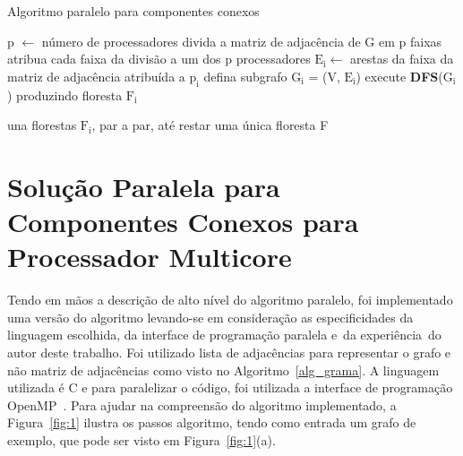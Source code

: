 \documentclass[12pt]{article}
\begin{document}
\begin{algorithm}[H]
    \DontPrintSemicolon
    \newcommand\mycommfont[1]{\small\ttfamily{#1}}
    \caption{Algoritmo paralelo para componentes conexos}
    \label{alg_grama}
    {
        p $\gets$ número de processadores\;
        divida a matriz de adjacência de G em p faixas\;
        atribua cada faixa da divisão a um dos p processadores\;
        {
            $\text{E}_\text{i} \gets$ arestas da faixa da matriz de adjacência atribuída a $\text{p}_\text{i}$\;
            defina subgrafo $\text{G}_\text{i}$ = (V, $\text{E}_\text{i}$)\;
            execute \textbf{DFS}($\text{G}_\text{i}$) produzindo floresta $\text{F}_\text{i}$\;
        }

        una florestas $\text{F}_\text{i}$, par a par, até restar uma única floresta F\;
        
    }
\end{algorithm}

\section{Solução Paralela para Componentes Conexos para Processador Multicore}
\label{paralelo}
Tendo em mãos a descrição de alto nível do algoritmo paralelo, foi implementado uma versão do algoritmo levando-se em consideração as especificidades da linguagem escolhida, da interface de programação paralela e da experiência do autor deste trabalho. Foi utilizado lista de adjacências para representar o grafo e não matriz de adjacências como visto no Algoritmo~\ref{alg_grama}. A linguagem utilizada é C e para paralelizar o código, foi utilizada a interface de programação OpenMP~\cite{OpenMP:2018}. Para ajudar na compreensão do algoritmo implementado, a Figura~\ref{fig:1} ilustra os passos algoritmo, tendo como entrada um grafo de exemplo, que pode ser visto em Figura~\ref{fig:1}(a).
\end{document}
